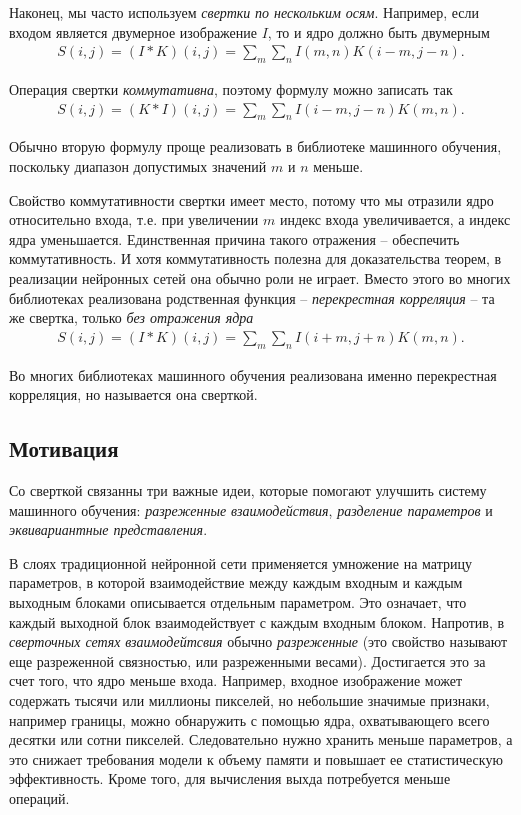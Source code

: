 \documentclass[%
	11pt,
	a4paper,
	utf8,
]{article}
\begin{document}
Наконец, мы часто используем \emph{свертки} \emph{по нескольким осям}. Например, если входом является двумерное изображение $ I $, то и ядро должно быть двумерным
\begin{align*}
	S(i, j) = (I * K)(i, j) = \sum_m \sum_n I(m, n)K(i - m, j - n).
\end{align*}

Операция свертки \emph{коммутативна}, поэтому формулу можно записать так
\begin{align*}
	S(i, j) = (K * I)(i, j) = \sum_m \sum_n I(i - m, j - n)K(m, n).
\end{align*}

Обычно вторую формулу проще реализовать в библиотеке машинного обучения, поскольку диапазон допустимых значений $ m $ и $ n $ меньше.

Свойство коммутативности  свертки имеет место, потому что мы отразили ядро относительно входа, т.е. при увеличении $ m $ индекс входа увеличивается, а индекс ядра уменьшается. Единственная причина такого отражения -- обеспечить коммутативность. И хотя коммутативность полезна для доказательства теорем, в реализации нейронных сетей она обычно роли не играет. Вместо этого во многих библиотеках реализована родственная функция -- \emph{перекрестная корреляция} -- та же свертка, только \emph{без отражения ядра}
\begin{align*}
	S(i, j) = (I * K)(i, j) = \sum_m \sum_n I(i +m, j + n) K(m, n).
\end{align*}

Во многих библиотеках машинного обучения реализована именно перекрестная корреляция, но называется она сверткой. 

\subsection{Мотивация}

Со сверткой связанны три важные идеи, которые помогают улучшить систему машинного обучения: \emph{разреженные взаимодействия}, \emph{разделение параметров} и \emph{эквивариантные представления}.

В слоях традиционной нейронной сети применяется умножение на матрицу параметров, в которой взаимодействие между каждым входным и каждым выходным блоками описывается отдельным параметром. Это означает, что каждый выходной блок взаимодействует с каждым входным блоком. Напротив, в \emph{сверточных сетях} \emph{взаимодейтсвия} обычно \emph{разреженные} (это свойство называют еще разреженной связностью, или разреженными весами). Достигается это за счет того, что ядро меньше входа. Например, входное изображение может содержать тысячи или миллионы пикселей, но небольшие значимые признаки, например границы, можно обнаружить с помощью ядра, охватывающего всего десятки или сотни пикселей. Следовательно нужно хранить меньше параметров, а это снижает требования модели к объему памяти и повышает ее статистическую эффективность. Кроме того, для вычисления выхда потребуется меньше операций. 
\end{document}
